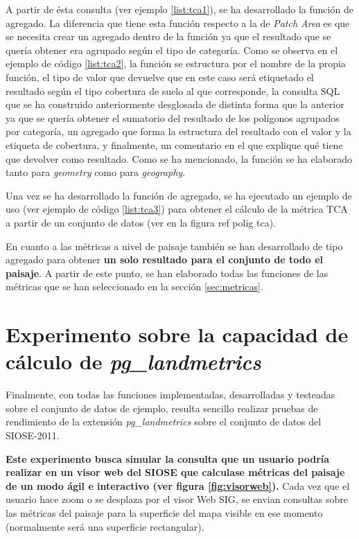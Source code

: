 \label{list:tca1}

A partir de ésta consulta (ver ejemplo \ref{list:tca1}), se ha desarrollado la función de agregado. La diferencia que tiene esta función respecto a la de \textit{Patch Area} es que se necesita crear un agregado dentro de la función ya que el resultado que se quería obtener era agrupado según el tipo de categoría. Como se observa en el ejemplo de código \ref{list:tca2}, la función se estructura por el nombre de la propia función, el tipo de valor que devuelve que en este caso será etiquetado el resultado según el tipo cobertura de suelo al que corresponde, la consulta SQL que se ha construido anteriormente desglosada de distinta forma que la anterior ya que se quería obtener el sumatorio del resultado de los polígonos agrupados por categoría, un agregado que forma la estructura del resultado con el valor y la etiqueta de cobertura, y finalmente, un comentario en el que explique qué tiene que devolver como resultado. Como se ha mencionado, la función se ha elaborado tanto para \textit{geometry} como para \textit{geography}.

\label{list:tca2}

Una vez se ha desarrollado la función de agregado, se ha ejecutado un ejemplo de uso (ver ejemplo de código \ref{list:tca3}) para obtener el cálculo de la métrica TCA a partir de un conjunto de datos (ver en la figura ref polig tca).

\label{list:tca3}

En cuanto a las métricas a nivel de paisaje también se han desarrollado de tipo agregado para obtener \textbf{un solo resultado para el conjunto de todo el paisaje}. A partir de este punto, se han elaborado todas las funciones de las métricas que se han seleccionado en la sección \ref{sec:metricas}.

\section{Experimento sobre la capacidad de cálculo de \textit{pg\_landmetrics}}

Finalmente, con todas las funciones implementadas, desarrolladas y testeadas sobre el conjunto de datos de ejemplo, resulta sencillo realizar pruebas de rendimiento de la extensión \textit{pg\_landmetrics} sobre el conjunto de datos del SIOSE-2011.

\textbf{Este experimento busca simular la consulta que un usuario podría realizar en un visor web del SIOSE que calculase métricas del paisaje de un modo ágil e interactivo (ver figura \ref{fig:visorweb}).} Cada vez que el usuario hace zoom o se desplaza por el visor Web SIG, se envian consultas sobre las métricas del paisaje para la superficie del mapa visible en ese momento (normalmente será una superficie rectangular). 

